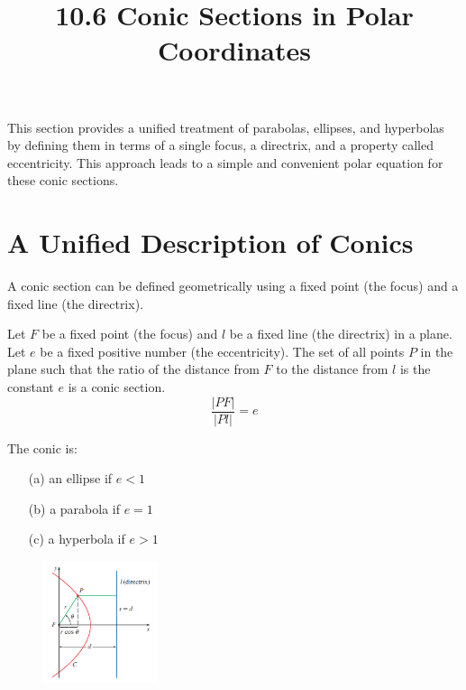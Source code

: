 \documentclass{article}
\title{10.6 Conic Sections in Polar Coordinates}
\date{}
\author{}
\begin{document}
\maketitle

This section provides a unified treatment of parabolas, ellipses, and hyperbolas by defining them in terms of a single focus, a directrix, and a property called eccentricity. This approach leads to a simple and convenient polar equation for these conic sections.

\section*{A Unified Description of Conics}

A conic section can be defined geometrically using a fixed point (the focus) and a fixed line (the directrix).

Let $F$ be a fixed point (the focus) and $l$ be a fixed line (the directrix) in a plane. Let $e$ be a fixed positive number (the eccentricity). The set of all points $P$ in the plane such that the ratio of the distance from $F$ to the distance from $l$ is the constant $e$ is a conic section.
\[
\frac{|PF|}{|Pl|} = e
\]
\begin{tcolorbox}[
    colback=white!,   %
    colframe=orange!80!white, %
    title=Conics Defined by a Focus and a Directrix,   %
    boxrule=0.5mm,          %
    arc=3mm               %
    ]
    The conic is:
\begin{itemize}
    \item[(a)] an ellipse if $e < 1$
    \item[(b)] a parabola if $e = 1$
    \item[(c)] a hyperbola if $e > 1$
\end{itemize}
\end{tcolorbox}

\begin{figure} %
    \includegraphics[width=0.3\textwidth]{graph60.png}
\end{figure}
\end{document}
